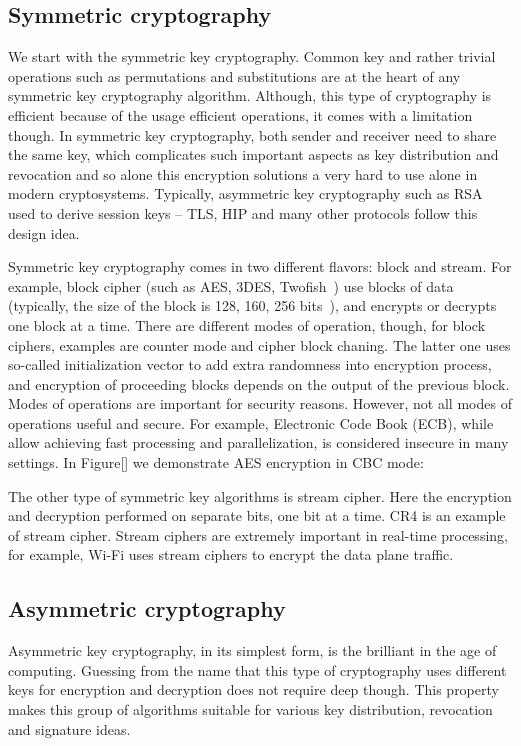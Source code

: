 \subsection{Symmetric cryptography}

We start with the symmetric key cryptography. Common key and rather 
trivial operations such as permutations and substitutions are at the 
heart of any symmetric key cryptography algorithm. Although, this type 
of cryptography is efficient because of the usage efficient operations, 
it comes with a limitation though. In symmetric key cryptography, 
both sender and receiver need to share the same key, which complicates 
such important aspects as key distribution and revocation and so alone 
this encryption solutions a very hard to use alone in modern cryptosystems. 
Typically, asymmetric key cryptography such as RSA used to derive session 
keys – TLS, HIP and many other protocols follow this design idea.

Symmetric key cryptography comes in two different flavors: block and stream. 
For example, block cipher (such as AES, 3DES, Twofish~\cite{Stinson:Cryptography}) 
use blocks of data (typically, the size of the block is 128, 160, 256 
bits~\cite{Stinson:Cryptography}), and encrypts or 
decrypts one block at a time. There are different modes of operation, though, 
for block ciphers, examples are counter mode and cipher block chaning. The latter 
one uses so-called initialization vector to add extra randomness into encryption 
process, and encryption of proceeding blocks depends on the output of the previous 
block. Modes of operations are important for security reasons. However, not all 
modes of operations useful and secure. For example, Electronic Code Book (ECB), 
while allow achieving fast processing and parallelization, is considered insecure in 
many settings. In Figure[] we demonstrate AES encryption in CBC mode:

The other type of symmetric key algorithms is stream cipher. Here the encryption 
and decryption performed on separate bits, one bit at a time. CR4 is an example 
of stream cipher. Stream ciphers are extremely important in real-time processing, 
for example, Wi-Fi uses stream ciphers to encrypt the data plane traffic.

\subsection{Asymmetric cryptography}

Asymmetric key cryptography, in its simplest form, is the brilliant in the age 
of computing. Guessing from the name that this type of cryptography uses different 
keys for encryption and decryption does not require deep though. This property makes 
this group of algorithms suitable for various key distribution, revocation and 
signature ideas. 

